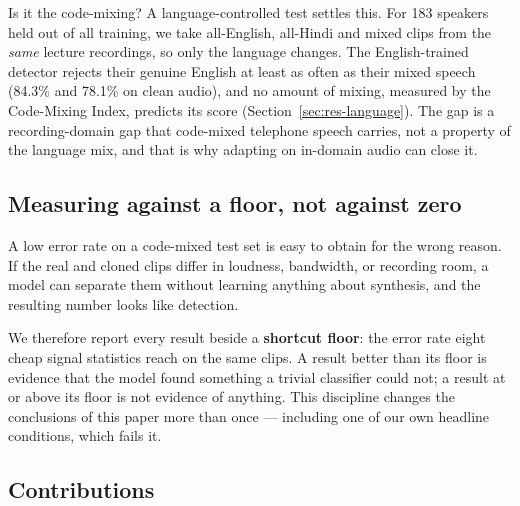 Is it the code-mixing? A language-controlled test settles this. For 183 speakers
held out of all training, we take all-English, all-Hindi and mixed clips from
the \emph{same} lecture recordings, so only the language changes. The English-trained
detector rejects their genuine English at least as often as their mixed speech (84.3\%
and 78.1\% on clean audio), and no amount of mixing, measured by the Code-Mixing Index,
predicts its score (Section~\ref{sec:res-language}). The gap is a recording-domain gap
that code-mixed telephone speech carries, not a property of the language mix, and
that is why adapting on in-domain audio can close it.

\subsection{Measuring against a floor, not against zero}

A low error rate on a code-mixed test set is easy to obtain for the wrong reason. If
the real and cloned clips differ in loudness, bandwidth, or recording room, a model
can separate them without learning anything about synthesis, and the resulting
number looks like detection.

We therefore report every result beside a \textbf{shortcut floor}: the error rate
eight cheap signal statistics reach on the same clips. A result better than its floor
is evidence that the model found something a trivial classifier could not; a result
at or above its floor is not evidence of anything. This discipline changes the
conclusions of this paper more than once --- including one of our own headline
conditions, which fails it.

\subsection{Contributions}

